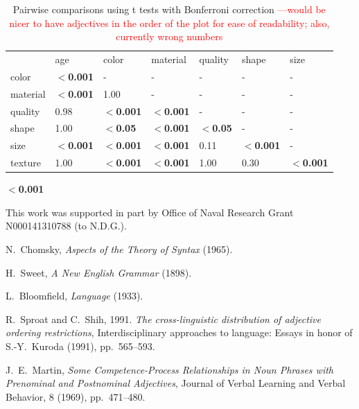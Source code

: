 \documentclass{pnastwo}
\newcommand{\red}[1]{\textcolor{Red}{#1}}
\begin{document}
\begin{article}
\begin{materials}
\begin{table}
	
\begin{tabular}{lllllll}
	   &    age & color & material & quality & shape & size  \\ 
color &		\textbf{$<$0.001} & -       & -        & - & - & - \\      
material &	\textbf{$<$0.001} & 1.00 & -        & - & - & - \\      
quality & 	0.98 & \textbf{$<$0.001} & \textbf{$<$0.001}  & - & - & - \\      
shape & 	1.00 & \textbf{$<$0.05} & \textbf{$<$0.001}  & \textbf{$<$0.05} & - & - \\     
size & 		\textbf{$<$0.001} & \textbf{$<$0.001} & \textbf{$<$0.001}  & 0.11 & \textbf{$<$0.001} & - \\     
texture & 	1.00 & \textbf{$<$0.001} & \textbf{$<$0.001}  & 1.00 & 0.30 & \textbf{$<$0.001}
\end{tabular}
\caption{Pairwise comparisons using t tests with Bonferroni correction \red{---would be nicer to have adjectives in the order of the plot for ease of readability; also, currently wrong numbers}}
\end{table}

\textbf{$<$0.001}



\end{materials}

\begin{acknowledgments}
This work was supported in part by Office of Naval Research Grant N000141310788 (to N.D.G.).
\end{acknowledgments}

\begin{thebibliography}{10}
	N.~Chomsky, {\em Aspects of the Theory of Syntax} (1965).

	H.~Sweet, {\em A New English Grammar} (1898).
	
	L.~Bloomfield, {\em Language} (1933).
	
	R.~Sproat and C.~Shih, 1991. {\em The cross-linguistic distribution of adjective ordering restrictions}, Interdisciplinary approaches to language: Essays in honor of S.-Y.~Kuroda (1991), pp.~565--593.
	
	J.~E.~Martin, {\em Some Competence-Process Relationships in Noun Phrases with Prenominal and Postnominal Adjectives}, Journal of Verbal Learning and Verbal Behavior, 8 (1969), pp.~471--480. 	
	

\end{thebibliography}
\end{article}
\end{document}

